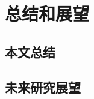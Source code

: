 \chapter{总结和展望}
\label{cha:conclusion}

\section{本文总结}
\label{chap6:conclusion}

\section{未来研究展望}
\label{chap6:expection}